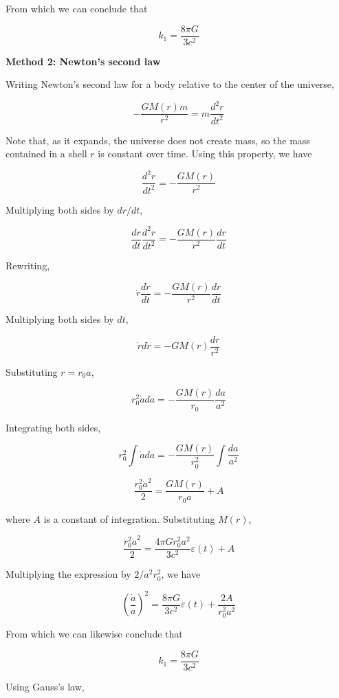 \documentclass[11pt]{article}
\begin{document}
\begin{pproblem}
\begin{pssolution*}{}{ }
\begin{alternativas}
        From which we can conclude that

        \[\boxed{k_1 = \frac{8\pi G}{3 c^2}}\]


        \textbf{Method 2: Newton's second law}

        Writing Newton's second law for a body relative to the center of the universe,

        \[-\frac{GM(r)m}{r^2} = m \frac{d^2r}{dt^2}\]

        Note that, as it expands, the universe does not create mass, so the mass contained in a shell \(r\) is constant over time. Using this property, we have

        \[\frac{d^2r}{dt^2} = -\frac{GM(r)}{r^2}\]

        Multiplying both sides by \(dr/dt\),

        \[\frac{dr}{dt} \frac{d^2r}{dt^2} = -\frac{GM(r)}{r^2} \frac{dr}{dt}\]

        Rewriting,

        \[\dot{r} \frac{d\dot{r}}{dt} = -\frac{GM(r)}{r^2} \frac{dr}{dt}\]

        Multiplying both sides by \(dt\),

        \[\dot{r} d\dot{r} = -GM(r) \frac{dr}{r^2}\]

        Substituting \(r = r_0 a\),

        \[r_0^2 \dot{a} d\dot{a} = -\frac{GM(r)}{r_0} \frac{da}{a^2}\]

        Integrating both sides,

        \[r_0^2 \int \dot{a} da = -\frac{GM(r)}{r_0^2} \int \frac{da}{a^2}\]

        \[\frac{r_0^2 \dot{a}^2}{2} = \frac{GM(r)}{r_0 a} + A\]

        where \(A\) is a constant of integration. Substituting \(M(r)\),

        \[\frac{r_0^2 \dot{a}^2}{2} = \frac{4\pi G r_0^2 a^2}{3c^2} \varepsilon(t) + A\]

        Multiplying the expression by \(2/a^2 r_0^2\), we have

        \[\left(\frac{\dot{a}}{a}\right)^2 = \frac{8\pi G}{3c^2} \varepsilon(t) + \frac{2A}{r_0^2 a^2}\]

        From which we can likewise conclude that

        \[\boxed{k_1 = \frac{8\pi G}{3c^2}}\]

        \item Using Gauss's law,


\end{alternativas}
\end{pssolution*}
\end{pproblem}
\end{document}
